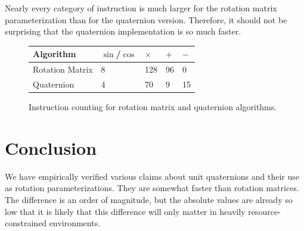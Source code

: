\documentclass{acm_proc_article-sp}
\begin{document}
Nearly every category of instruction is much larger for the rotation matrix parameterization than for the quaternion version.
Therefore, it should not be surprising that the quaternion implementation is so much faster.

\begin{figure}
\begin{tabular}{l|l|l|l|l}
    Algorithm       & $\sin$/$\cos$  & $\times$      & $+$       & $-$  \\
    \hline
    Rotation Matrix & 8              & 128           & 96        & 0             \\
    Quaternion      & 4              & 70            & 9         & 15            \\

\end{tabular}
\caption{Instruction counting for rotation matrix and quaternion algorithms.}
\end{figure}

\section{Conclusion}

We have empirically verified various claims about unit quaternions and their use as rotation parameterizations.
They are somewhat faster than rotation matrices.
The difference is an order of magnitude, but the absolute values are already so low that it is likely that this difference will only matter in heavily resource-constrained environments.

\printbibliography
\end{document}
